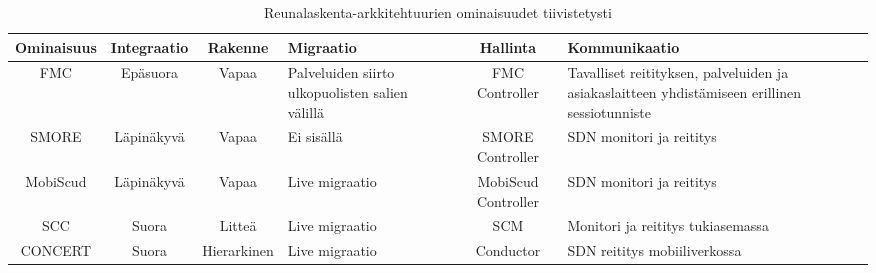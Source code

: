 


%
%
%
%
%
%

\begin{landscape}
    \noindent
\begin{table}[!ht]
\caption{Reunalaskenta-arkkitehtuurien ominaisuudet tiivistetysti}
\label{table:features}
\begin{tabularx}{ \linewidth }{ | c | c | c | p{3cm} | c | p{5cm} | }
\hline 
 \textbf{Ominaisuus} & \textbf{Integraatio} & \textbf{Rakenne} & \textbf{Migraatio} & \textbf{Hallinta} & \textbf{Kommunikaatio} \\ 
\hline 
 FMC & Epäsuora & Vapaa & Palveluiden siirto ulkopuolisten salien välillä & FMC Controller & Tavalliset reitityksen, palveluiden ja asiakaslaitteen yhdistämiseen erillinen sessiotunniste \\ 
\hline 
 SMORE & Läpinäkyvä & Vapaa & Ei sisällä & SMORE Controller & SDN monitori ja reititys \\ 
\hline 
MobiScud & Läpinäkyvä & Vapaa & Live migraatio & MobiScud Controller & SDN monitori ja reititys\\ 
\hline 
SCC & Suora & Litteä & Live migraatio & SCM & Monitori ja reititys tukiasemassa \\ 
\hline 
CONCERT & Suora & Hierarkinen & Live migraatio & Conductor & SDN reititys mobiiliverkossa \\ 
\hline 
\end{tabularx} 
\end{table}
\end{landscape}